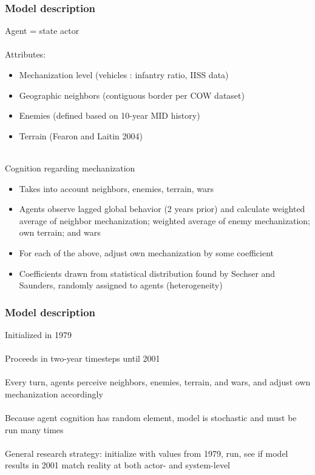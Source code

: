 \documentclass{beamer}
\begin{document}
\begin{frame}
	\frametitle{Model description}
	Agent = state actor\\~\\

	Attributes:
	\begin{itemize}
		\item \small Mechanization level (vehicles : infantry ratio,
			IISS data)
		\item \small Geographic neighbors (contiguous border per COW dataset)
		\item \small Enemies (defined based on 10-year MID history)
		\item \small Terrain (Fearon and Laitin 2004) \\~\\
	\end{itemize}

	Cognition regarding mechanization
	\begin{itemize}
		\item \small Takes into account neighbors, enemies, terrain,
			wars
		\item \small Agents observe lagged global behavior (2 years prior) and calculate
			weighted average of neighbor mechanization; weighted
			average of enemy mechanization; own terrain; and wars
		\item \small For each of the above, adjust own mechanization by some
			coefficient
		\item \small Coefficients drawn from statistical distribution
			found by Sechser and Saunders, randomly assigned to
			agents (heterogeneity)
	\end{itemize}
\end{frame}

\begin{frame}
	\frametitle{Model description}
	Initialized in 1979 \\~\\

	Proceeds in two-year timesteps until 2001 \\~\\

	Every turn, agents perceive neighbors, enemies, terrain, and wars, and
	adjust own mechanization accordingly \\~\\

	Because agent cognition has random element, model is stochastic and must
	be run many times \\~\\

	General research strategy: initialize with values from 1979, run, see if model results in 2001 match reality at both
	actor- and system-level
\end{frame}
\end{document}
